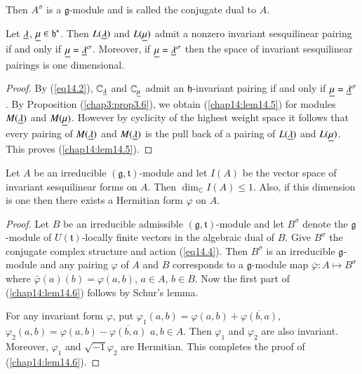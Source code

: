 Then $A^\sigma$ is a $\mathfrak{g}$-module and is called the conjugate
dual to $A$. 

\setcounter{prop}{4}
\begin{lemma}\label{chap14:lem14.5}
Let $\underline{\lambda}$, $\underline{\mu} \in \mathfrak{h}^*$. Then
$L(\underline{\lambda})$ and $L(\underline{\mu})$ admit a nonzero invariant
sesquilinear pairing if and only if $\underline{\mu} =
\underline{\lambda}^\sigma$. Moreover, if $\underline{\mu} = \underline{\lambda}^\sigma$ then
the space of invariant sesquilinear pairings is one dimensional. 
\end{lemma}

\begin{proof}
By (\ref{eq14.2}), $\mathbb{C}_{\underline{\lambda}}$ and $\mathbb{C}_{\underline{\mu}}$ admit
an $\mathfrak{h}$-invariant pairing if and only if $\underline{\mu} =
\underline{\lambda}^\sigma$. By Proposition (\ref{chap3:prop3.6}), we obtain
(\ref{chap14:lem14.5}) for 
modules $M(\underline{\lambda})$ and $M(\underline{\mu})$. However by cyclicity of the
highest weight space it follows that every pairing of $M(\underline{\lambda})$
and $M(\underline{\lambda})$ is the pull back of a pairing of $L(\underline{\lambda})$
and $L(\underline{\mu})$. This proves (\ref{chap14:lem14.5}). 
\end{proof}

\begin{lemma}\label{chap14:lem14.6}
Let $A$ be an irreducible $(\mathfrak{g}, \mathfrak{t})$-module and
let $I(A)$ be the vector space of invariant sesquilinear forms on
$A$. Then $\dim_\mathbb{C} I(A) \leq 1$. Also, if this dimension is
one then there exists a Hermitian form $\varphi$ on $A$.  
\end{lemma}

\begin{proof}
Let $B$ be an irreducible admissible $(\mathfrak{g},
\mathfrak{t})$-module and let $B^\sigma$ denote the
$\mathfrak{g}$-module of $U(\mathfrak{t})$-locally finite vectors in
the algebraic dual of $B$. Give $B^\sigma$ the conjugate complex
structure and action (\ref{eq14.4}). Then $B^\sigma$ is an irreducible
$\mathfrak{g}$-module and any pairing $\varphi$ of $A$ and $B$
corresponds to a $\mathfrak{g}$-module map $\bar{\varphi}: A \mapsto
B^\sigma$ where $\bar{\varphi} (a)(b) = \varphi(a, b)$, $a\in A$, $b
\in B$. Now the first part of (\ref{chap14:lem14.6}) follows by Schur's lemma. 

For any invariant form $\varphi$, put $\varphi_1 (a,b) = \varphi(a,b)
+ \overline{\varphi(b,a)}$, $\varphi_2 (a,b) = \varphi(a,b) -
\overline{\varphi(b, a)}$ $a, b \in A$. Then $\varphi_1$ and
$\varphi_2$ are also invariant. Moreover, $\varphi_1$ and $\sqrt{-1}
\varphi_2$ are Hermitian. This completes the proof of (\ref{chap14:lem14.6}). 
\end{proof}

